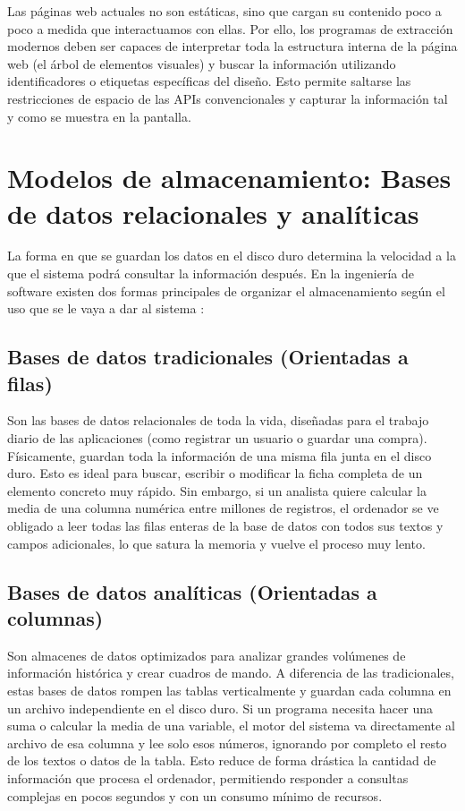 Las páginas web actuales no son estáticas, sino que cargan su contenido poco a poco a medida que interactuamos con ellas. Por ello, los programas de extracción modernos deben ser capaces de interpretar toda la estructura interna de la página web (el árbol de elementos visuales) y buscar la información utilizando identificadores o etiquetas específicas del diseño. Esto permite saltarse las restricciones de espacio de las APIs convencionales y capturar la información tal y como se muestra en la pantalla.

\section{Modelos de almacenamiento: Bases de datos relacionales y analíticas}
La forma en que se guardan los datos en el disco duro determina la velocidad a la que el sistema podrá consultar la información después. En la ingeniería de software existen dos formas principales de organizar el almacenamiento según el uso que se le vaya a dar al sistema \cite{gcp_bigquery_storage}:

\subsection{Bases de datos tradicionales (Orientadas a filas)}
Son las bases de datos relacionales de toda la vida, diseñadas para el trabajo diario de las aplicaciones (como registrar un usuario o guardar una compra). Físicamente, guardan toda la información de una misma fila junta en el disco duro. Esto es ideal para buscar, escribir o modificar la ficha completa de un elemento concreto muy rápido. Sin embargo, si un analista quiere calcular la media de una columna numérica entre millones de registros, el ordenador se ve obligado a leer todas las filas enteras de la base de datos con todos sus textos y campos adicionales, lo que satura la memoria y vuelve el proceso muy lento.

\subsection{Bases de datos analíticas (Orientadas a columnas)}
Son almacenes de datos optimizados para analizar grandes volúmenes de información histórica y crear cuadros de mando. A diferencia de las tradicionales, estas bases de datos rompen las tablas verticalmente y guardan cada columna en un archivo independiente en el disco duro. Si un programa necesita hacer una suma o calcular la media de una variable, el motor del sistema va directamente al archivo de esa columna y lee solo esos números, ignorando por completo el resto de los textos o datos de la tabla. Esto reduce de forma drástica la cantidad de información que procesa el ordenador, permitiendo responder a consultas complejas en pocos segundos y con un consumo mínimo de recursos.

